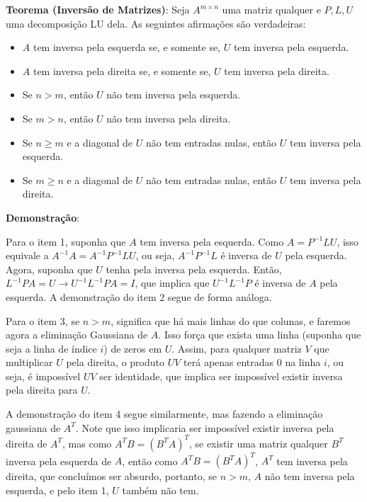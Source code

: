 \documentclass[11pt, a4paper]{article}
\begin{document}
\textbf{Teorema (Inversão de Matrizes)}: Seja \(A^{m\times n}\) uma matriz qualquer e \(P,L,U\) uma decomposição LU dela. As seguintes afirmações são verdadeiras:
\begin{itemize}
    \item \(A\) tem inversa pela esquerda se, e somente se, \(U\) tem inversa pela esquerda.
    \item \(A\) tem inversa pela direita se, e somente se, \(U\) tem inversa pela direita.
    \item Se \(n>m\), então \(U\) não tem inversa pela esquerda.
    \item Se \(m>n\), então \(U\) não tem inversa pela direita.
    \item Se \(n\geq m\) e a diagonal de \(U\) não tem entradas nulas, então \(U\) tem inversa pela esquerda.
    \item Se \(m\geq n\) e a diagonal de \(U\) não tem entradas nulas, então \(U\) tem inversa pela direita.
\end{itemize}

\textbf{Demonstração}:

Para o item 1, suponha que \(A\) tem inversa pela esquerda. Como \(A=P^{-1}LU\), isso equivale a  \(A^{-1}A=A^{-1}P^{-1}LU\), ou seja, \(A^{-1}P^{-1}L\) é inversa de \(U\) pela esquerda. Agora, suponha que \(U\) tenha pela inversa pela esquerda. Então, \(L^{-1}PA=U \rightarrow U^{-1}L^{-1}PA=I\), que implica que \(U^{-1}L^{-1}P\) é inversa de \(A\) pela esquerda. A demonstração do item 2 segue de forma análoga.

Para o item 3, se \(n > m\), significa que há mais linhas do que colunas, e faremos agora a eliminação Gaussiana de \(A\). Isso força que exista uma linha (suponha que seja a linha de índice \(i\)) de zeros em \(U\). Assim, para qualquer matriz \(V\) que multiplicar \(U\) pela direita, o produto \(UV\) terá apenas entradas 0 na linha \(i\), ou seja, é impossível \(UV\) ser identidade, que implica ser impossível existir inversa pela direita para \(U\).

A demonstração do item 4 segue similarmente, mas fazendo a eliminação gaussiana de \(A^T\). Note que isso implicaria ser impossível existir inversa pela direita de \(A^T\), mas como \(A^TB=(B^TA)^T\), se existir uma matriz qualquer \(B^T\) inversa pela esquerda de \(A\), então como \(A^TB=(B^TA)^T\), \(A^T\) tem inversa pela direita, que concluímos ser absurdo, portanto, se \(n > m\), \(A\) não tem inversa pela esquerda, e pelo item 1, \(U\) também não tem. 
\end{document}
